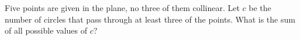 Five points are given in the plane, no three of them collinear. Let $c$ be the number of circles that pass through at least three of the points. What is the sum of all possible values of $c$?
